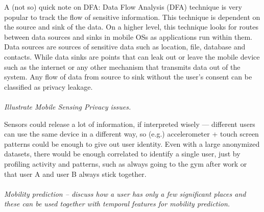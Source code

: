 \documentclass[12pt]{article}
\newcommand*\circled[1]{\tikz[baseline=(char.base)]{
		\node[shape=circle,draw,inner sep=0pt] (char) {#1};}}
\begin{document}
A (not so) quick note on DFA: Data Flow Analysis (DFA) technique is very popular
to track the flow of sensitive information. This technique  is  dependent  on
the  source  and  sink  of  the  data. On  a  higher  level,  this  technique
looks  for  routes  between data  sources  and  sinks  in  mobile  OSs  as
applications  run within  them.  Data  sources  are  sources  of  sensitive
data  such as  location,  file,  database  and  contacts.  While  data  sinks
are points  that  can  leak  out  or  leave  the  mobile  device  such  as the
internet or any other mechanism that transmits data out of the system. Any flow
of data from source to sink without the user's consent can be classified as
privacy leakage.
~\\
~\\
\textit{\circled{2.} Illustrate Mobile Sensing Privacy issues.}

Sensors could release a lot of information, if interpreted wisely --- different
users can use the same device in a different way, so (e.g.) accelerometer
+ touch screen patterns could be enough to give out user identity. Even with
a large anonymized datasets, there would be enough correlated to identify
a single user, just by profiling activity and patterns, such as always going to
the gym after work or that user A and user B always stick together.
\\
\\
\textit{\circled{3.} Mobility prediction -- discuss how a user has only a few
significant places and these can be used together with temporal features for
mobility prediction.}
\end{document}
